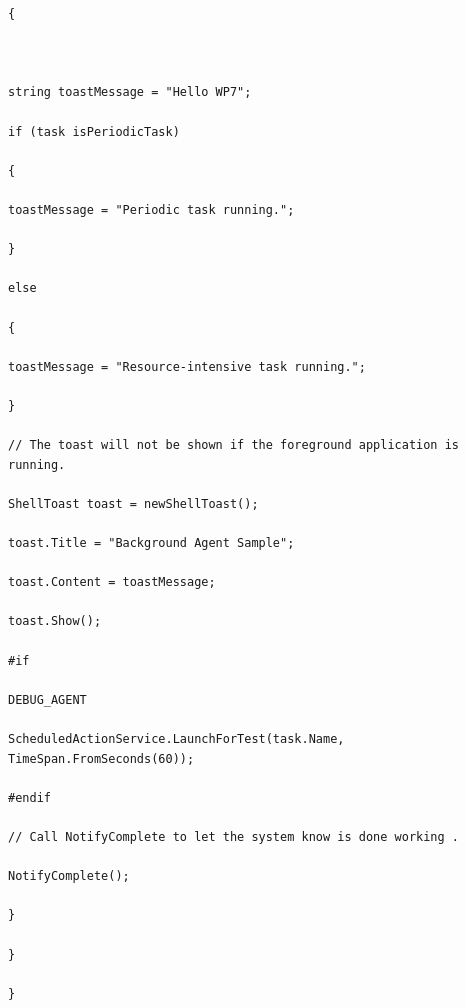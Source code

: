 \documentclass[a4paper,10pt]{scrreprt}
\begin{document}
\begin{lstlisting}[caption=ResourceIntensiveTask]
{



string toastMessage = "Hello WP7";

if (task isPeriodicTask)

{

toastMessage = "Periodic task running.";

}

else

{

toastMessage = "Resource-intensive task running.";

}

// The toast will not be shown if the foreground application is running.

ShellToast toast = newShellToast();

toast.Title = "Background Agent Sample";

toast.Content = toastMessage;

toast.Show();

#if

DEBUG_AGENT

ScheduledActionService.LaunchForTest(task.Name, TimeSpan.FromSeconds(60));

#endif

// Call NotifyComplete to let the system know is done working .

NotifyComplete();

}

}

}

\end{lstlisting}
\end{document}
